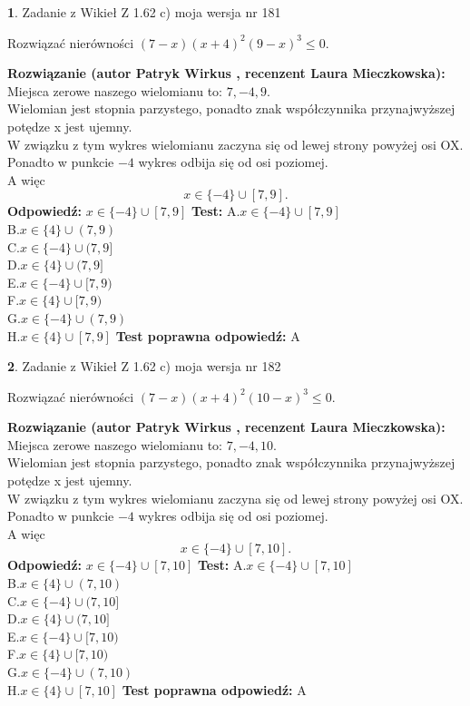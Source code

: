 \documentclass[12pt, a4paper]{article}
\theoremstyle{definition} %
\newtheorem{zad}{}
\newcommand{\zadStart}[1]{\begin{zad}#1\newline}
\newcommand{\zadStop}{\end{zad}}
\newcommand{\rozwStart}[2]{\noindent \textbf{Rozwiązanie (autor #1 , recenzent #2): }\newline}
\newcommand{\rozwStop}{\newline}
\newcommand{\odpStart}{\noindent \textbf{Odpowiedź:}\newline}
\newcommand{\odpStop}{\newline}
\newcommand{\testStart}{\noindent \textbf{Test:}\newline}
\newcommand{\testStop}{\newline}
\newcommand{\kluczStart}{\noindent \textbf{Test poprawna odpowiedź:}\newline}
\newcommand{\kluczStop}{\newline}
\begin{document}
\zadStart{Zadanie z Wikieł Z 1.62 c) moja wersja nr 181}

Rozwiązać nierówności $(7-x)(x+4)^{2}(9-x)^{3}\le0$.
\zadStop
\rozwStart{Patryk Wirkus}{Laura Mieczkowska}
Miejsca zerowe naszego wielomianu to: $7, -4, 9$.\\
Wielomian jest stopnia parzystego, ponadto znak współczynnika przy\linebreak najwyższej potędze x jest ujemny.\\ W związku z tym wykres wielomianu zaczyna się od lewej strony powyżej osi OX.\\
Ponadto w punkcie $-4$ wykres odbija się od osi poziomej.\\
A więc $$x \in \{-4\} \cup [7,9].$$
\rozwStop
\odpStart
$x \in \{-4\} \cup [7,9]$
\odpStop
\testStart
A.$x \in \{-4\} \cup [7,9]$\\
B.$x \in \{4\} \cup (7,9)$\\
C.$x \in \{-4\} \cup (7,9]$\\
D.$x \in \{4\} \cup (7,9]$\\
E.$x \in \{-4\} \cup [7,9)$\\
F.$x \in \{4\} \cup [7,9)$\\
G.$x \in \{-4\} \cup (7,9)$\\
H.$x \in \{4\} \cup [7,9]$
\testStop
\kluczStart
A
\kluczStop



\zadStart{Zadanie z Wikieł Z 1.62 c) moja wersja nr 182}

Rozwiązać nierówności $(7-x)(x+4)^{2}(10-x)^{3}\le0$.
\zadStop
\rozwStart{Patryk Wirkus}{Laura Mieczkowska}
Miejsca zerowe naszego wielomianu to: $7, -4, 10$.\\
Wielomian jest stopnia parzystego, ponadto znak współczynnika przy\linebreak najwyższej potędze x jest ujemny.\\ W związku z tym wykres wielomianu zaczyna się od lewej strony powyżej osi OX.\\
Ponadto w punkcie $-4$ wykres odbija się od osi poziomej.\\
A więc $$x \in \{-4\} \cup [7,10].$$
\rozwStop
\odpStart
$x \in \{-4\} \cup [7,10]$
\odpStop
\testStart
A.$x \in \{-4\} \cup [7,10]$\\
B.$x \in \{4\} \cup (7,10)$\\
C.$x \in \{-4\} \cup (7,10]$\\
D.$x \in \{4\} \cup (7,10]$\\
E.$x \in \{-4\} \cup [7,10)$\\
F.$x \in \{4\} \cup [7,10)$\\
G.$x \in \{-4\} \cup (7,10)$\\
H.$x \in \{4\} \cup [7,10]$
\testStop
\kluczStart
A
\kluczStop
\end{document}
